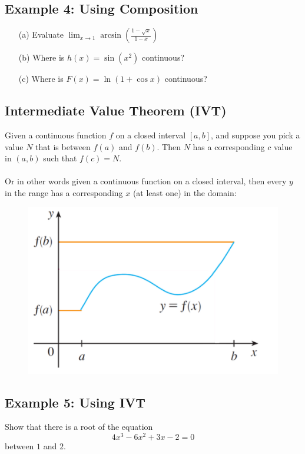\documentclass[10pt]{book}
\theoremstyle{definition}
\begin{document}
    \subsection*{Example 4: Using Composition}
    \begin{itemize}
        \item[(a)] Evaluate $\displaystyle\lim_{x\rightarrow 1}\arcsin\left(\frac{1-\sqrt{x}}{1-x}\right)$ \vspace{4cm}
        \item[(b)] Where is $h(x)=\sin(x^2)$ continuous?\vspace{4cm}
        \item[(c)] Where is $F(x)=\ln(1+\cos x)$ continuous?
    \end{itemize}
    \raggedbottom
    \clearpage
    \begin{tcolorbox}
    \subsection*{Intermediate Value Theorem (IVT)} Given a continuous function $f$ on a closed interval $[a,b]$, and suppose you pick a value $N$ that is between $f(a)$ and $f(b)$. Then $N$ has a corresponding $c$ value in $(a,b)$ such that $f(c)=N$.\\ \\
    Or in other words given a continuous function on a closed interval, then every $y$ in the range has a corresponding $x$ (at least one) in the domain:
    \end{tcolorbox}
    \begin{figure}[h!]
        \centering
        \includegraphics[scale=0.5]{fig2.png}
    \end{figure}
    \subsection*{Example 5: Using IVT}
    Show that there is a root of the equation
    \[
    4x^3-6x^2+3x-2=0
    \]
    between $1$ and $2$.
\end{document}

